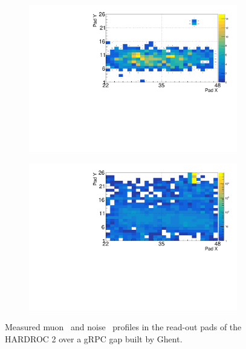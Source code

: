 	\begin{figure}[H]
		\begin{subfigure}{.5\linewidth}
		    \centering
			\includegraphics[width = \linewidth]{fig/chapt6/Muon-Profile-gRPC-HARDROC.pdf}
			\caption{\label{fig:HARDROC2-gRPC-profiles:A}}
		\end{subfigure}
		\begin{subfigure}{.5\linewidth}
		    \centering
			\includegraphics[width = \linewidth]{fig/chapt6/Noise-Profile-gRPC-HARDROC.pdf}
			\caption{\label{fig:HARDROC2-gRPC-profiles:B}}
		\end{subfigure}
		\caption{\label{fig:HARDROC2-gRPC-profiles} Measured muon~ and noise~ profiles in the read-out pads of the HARDROC 2 over a gRPC gap built by Ghent.}
    \end{figure}
    
